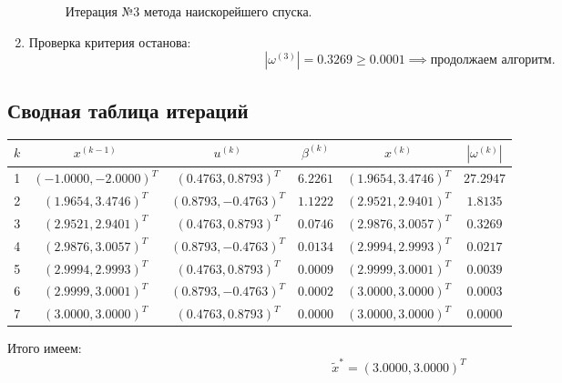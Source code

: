 \documentclass[12pt]{article}
\begin{document}
\begin{enumerate}
\begin{figure}[H]
  \caption{Итерация №3 метода наискорейшего спуска.}
  \end{figure}

  \item Проверка критерия останова:
  \[
    |\omega^{(3)}|=0.3269\geq 0.0001\implies\text{продолжаем алгоритм.}
  \]
\end{enumerate}


\subsection{Сводная таблица итераций}
\begin{table}[H]
\centering
\begin{tabular}{|c|c|c|c|c|c|}
\hline
$k$ & $x^{(k-1)}$ & $u^{(k)}$ & $\beta^{(k)}$ & $x^{(k)}$ & $|\omega^{(k)}|$ \\
\hline
1 & $(-1.0000, -2.0000)^T$ & $(0.4763, 0.8793)^T$ & $6.2261$ & $(1.9654, 3.4746)^T$ & $27.2947$ \\
\hline
2 & $(1.9654, 3.4746)^T$ & $(0.8793, -0.4763)^T$ & $1.1222$ & $(2.9521, 2.9401)^T$ & $1.8135$ \\
\hline
3 & $(2.9521, 2.9401)^T$ & $(0.4763, 0.8793)^T$ & $0.0746$ & $(2.9876, 3.0057)^T$ & $0.3269$ \\
\hline
4 & $(2.9876, 3.0057)^T$ & $(0.8793, -0.4763)^T$ & $0.0134$ & $(2.9994, 2.9993)^T$ & $0.0217$ \\
\hline
5 & $(2.9994, 2.9993)^T$ & $(0.4763, 0.8793)^T$ & $0.0009$ & $(2.9999, 3.0001)^T$ & $0.0039$ \\
\hline
6 & $(2.9999, 3.0001)^T$ & $(0.8793, -0.4763)^T$ & $0.0002$ & $(3.0000, 3.0000)^T$ & $0.0003$ \\
\hline
7 & $(3.0000, 3.0000)^T$ & $(0.4763, 0.8793)^T$ & $0.0000$ & $(3.0000, 3.0000)^T$ & $0.0000$ \\
\hline

\end{tabular}
\end{table}

Итого имеем:
\[
  \tilde{x}^{\ast}=(3.0000, 3.0000)^T
\]
\end{document}

